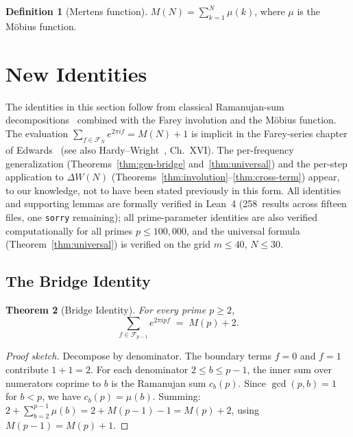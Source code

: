 \documentclass[11pt]{article}
\newtheorem{theorem}{Theorem}[section]
\theoremstyle{definition}
\newtheorem{definition}[theorem]{Definition}
\newcommand{\F}{\mathcal{F}}
\begin{document}
\begin{definition}[Mertens function]
$M(N) = \sum_{k=1}^{N} \mu(k)$,
where $\mu$ is the M\"obius function.
\end{definition}


\section{New Identities}\label{sec:identities}

The identities in this section follow from classical
Ramanujan-sum decompositions~\cite{Ramanujan1918, Kanemitsu1982}
combined with the Farey involution and the M\"obius function.
The evaluation $\sum_{f \in \F_N} e^{2\pi i f} = M(N)+1$ is
implicit in the Farey-series chapter of Edwards~\cite{Edwards1974}
(see also Hardy--Wright~\cite{HardyWright2008}, Ch.~XVI\@).
The per-frequency generalization (Theorems~\ref{thm:gen-bridge}
and~\ref{thm:universal}) and the per-step application to
$\Delta W(N)$ (Theorems~\ref{thm:involution}--\ref{thm:cross-term})
appear, to our knowledge, not to have been stated previously
in this form.  All identities and supporting lemmas are
formally verified in Lean~4 (258~results across fifteen files,
one \texttt{sorry} remaining); all prime-parameter identities
are also verified
computationally for all primes $p \le 100{,}000$, and the universal
formula (Theorem~\ref{thm:universal}) is verified on the grid
$m \le 40$, $N \le 30$.

\subsection{The Bridge Identity}

\begin{theorem}[Bridge Identity]\label{thm:bridge}
For every prime $p \ge 2$,
\begin{equation}\label{eq:bridge}
  \sum_{f \in \F_{p-1}} e^{2\pi i p f}
  \;=\; M(p) + 2.
\end{equation}
\end{theorem}

\begin{proof}[Proof sketch]
Decompose by denominator.  The boundary terms $f = 0$ and $f = 1$
contribute $1 + 1 = 2$.  For each denominator $2 \le b \le p-1$,
the inner sum over numerators coprime to $b$ is the Ramanujan sum
$c_b(p)$.  Since $\gcd(p, b) = 1$ for $b < p$, we have
$c_b(p) = \mu(b)$.  Summing: $2 + \sum_{b=2}^{p-1} \mu(b) =
2 + M(p-1) - 1 = M(p) + 2$, using $M(p-1) = M(p) + 1$.
\end{proof}
\end{document}
